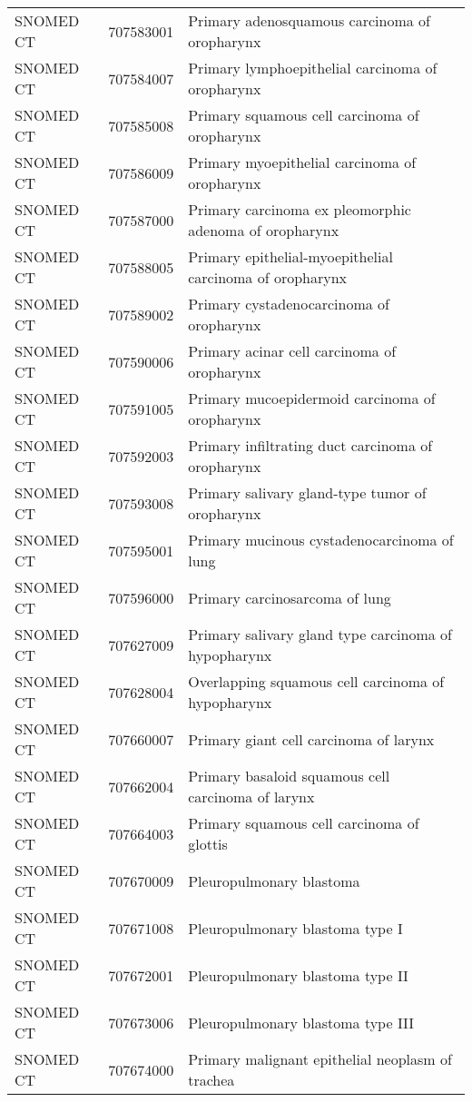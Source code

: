 \begin{longtable}{p{}p{}p{}}
  SNOMED CT & 707583001 & Primary adenosquamous carcinoma of oropharynx \\ 
  SNOMED CT & 707584007 & Primary lymphoepithelial carcinoma of oropharynx \\ 
  SNOMED CT & 707585008 & Primary squamous cell carcinoma of oropharynx \\ 
  SNOMED CT & 707586009 & Primary myoepithelial carcinoma of oropharynx \\ 
  SNOMED CT & 707587000 & Primary carcinoma ex pleomorphic adenoma of oropharynx \\ 
  SNOMED CT & 707588005 & Primary epithelial-myoepithelial carcinoma of oropharynx \\ 
  SNOMED CT & 707589002 & Primary cystadenocarcinoma of oropharynx \\ 
  SNOMED CT & 707590006 & Primary acinar cell carcinoma of oropharynx \\ 
  SNOMED CT & 707591005 & Primary mucoepidermoid carcinoma of oropharynx \\ 
  SNOMED CT & 707592003 & Primary infiltrating duct carcinoma of oropharynx \\ 
  SNOMED CT & 707593008 & Primary salivary gland-type tumor of oropharynx \\ 
  SNOMED CT & 707595001 & Primary mucinous cystadenocarcinoma of lung \\ 
  SNOMED CT & 707596000 & Primary carcinosarcoma of lung \\ 
  SNOMED CT & 707627009 & Primary salivary gland type carcinoma of hypopharynx \\ 
  SNOMED CT & 707628004 & Overlapping squamous cell carcinoma of hypopharynx \\ 
  SNOMED CT & 707660007 & Primary giant cell carcinoma of larynx \\ 
  SNOMED CT & 707662004 & Primary basaloid squamous cell carcinoma of larynx \\ 
  SNOMED CT & 707664003 & Primary squamous cell carcinoma of glottis \\ 
  SNOMED CT & 707670009 & Pleuropulmonary blastoma \\ 
  SNOMED CT & 707671008 & Pleuropulmonary blastoma type I \\ 
  SNOMED CT & 707672001 & Pleuropulmonary blastoma type II \\ 
  SNOMED CT & 707673006 & Pleuropulmonary blastoma type III \\ 
  SNOMED CT & 707674000 & Primary malignant epithelial neoplasm of trachea \\ 

\end{longtable}
